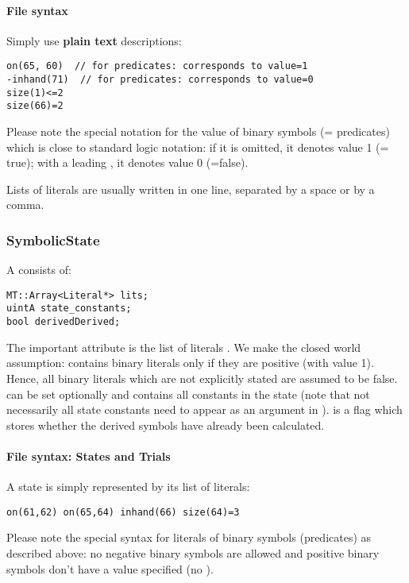 \documentclass[10pt,twoside,twocolumn,fleqn]{article}
\begin{document}
\paragraph{File syntax}

Simply use \textbf{plain text} descriptions:
\begin{lstlisting}
on(65, 60)  // for predicates: corresponds to value=1
-inhand(71)  // for predicates: corresponds to value=0
size(1)<=2
size(66)=2
\end{lstlisting}
Please note the special notation for the value of binary symbols (=
predicates) which is close to standard logic notation: if it is omitted, it
denotes value 1 (= true); with a leading \code{-}, it denotes value 0
(=false).

Lists of literals are usually written in one line, separated by a space
or by a comma.





\subsubsection{SymbolicState}

A  consists of:
\begin{lstlisting}
MT::Array<Literal*> lits;
uintA state_constants;
bool derivedDerived;
\end{lstlisting}
The important attribute is the list of literals . We make the 
closed world assumption:  contains binary literals only if
they are positive (with value 1). Hence, all binary literals which are not
explicitly stated are assumed to be false.  can be
set optionally and contains all constants in the state (note that not
necessarily all state constants need to appear as an argument in
).  is a flag which stores whether the
derived symbols have already been calculated.



\paragraph{File syntax: States and Trials}

A state is simply represented by its list of literals:
\begin{lstlisting}
on(61,62) on(65,64) inhand(66) size(64)=3
\end{lstlisting}
Please note the special syntax for literals of binary symbols
(predicates) as described above: no negative binary symbols are allowed
and positive binary symbols don't have a value specified (no ).
\end{document}
